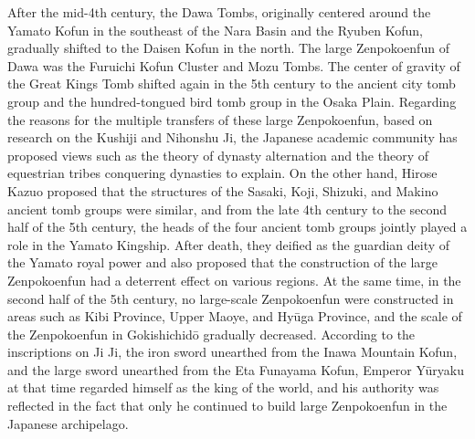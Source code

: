 \begin{tcolorbox}[breakable, colback=white, colframe=black!80,
  boxrule=0.6pt, arc=0mm, left=3mm, right=3mm, top=2mm, bottom=2mm]
After the mid-{}4th century, the Dawa Tombs, originally centered around the Yamato Kofun in the southeast of the Nara Basin and the Ryuben Kofun, gradually shifted to the Daisen Kofun in the north. The large Zenpokoenfun of Dawa was the Furuichi Kofun Cluster and Mozu Tombs. The center of gravity of the Great King\textquotesingle{}s Tomb shifted again in the 5th century to the ancient city tomb group and the hundred-{}tongued bird tomb group in the Osaka Plain. Regarding the reasons for the multiple transfers of these large Zenpokoenfun, based on research on the \textquotedbl{}Kushiji\textquotedbl{} and \textquotedbl{}Nihonshu Ji\textquotedbl{}, the Japanese academic community has proposed views such as the theory of dynasty alternation and the theory of equestrian tribes conquering dynasties to explain. On the other hand, Hirose Kazuo proposed that the structures of the Sasaki, Koji, Shizuki, and Makino ancient tomb groups were similar, and from the late 4th century to the second half of the 5th century, the heads of the four ancient tomb groups jointly played a role in the Yamato Kingship. After death, they deified as the guardian deity of the Yamato royal power and also proposed that the construction of the large Zenpokoenfun had a deterrent effect on various regions. At the same time, in the second half of the 5th century, no large-{}scale Zenpokoenfun were constructed in areas such as Kibi Province, Upper Maoye, and Hyūga Province, and the scale of the Zenpokoenfun in Gokishichidō gradually decreased. According to the inscriptions on Ji Ji, the iron sword unearthed from the Inawa Mountain Kofun, and the large sword unearthed from the Eta Funayama Kofun, Emperor Yūryaku at that time regarded himself as the king of the world, and his authority was reflected in the fact that only he continued to build large Zenpokoenfun in the Japanese archipelago.\par
\medskip

\end{tcolorbox}
